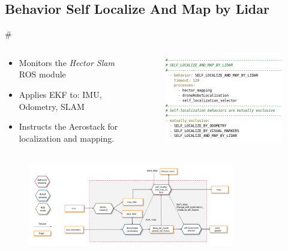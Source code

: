 \documentclass[]{beamer}
\def\mOrangeItem{\item[\textcolor{orange}{\textbullet}]}
\newcommand{\mSlideTitle}{{{\color{gray}\secname}} \# \subsecname}
\begin{document}
\subsection{Behavior Self Localize And Map by Lidar}
\begin{frame}{\mSlideTitle}
  \begin{columns}
    \begin{column}{0.5\textwidth}
      \begin{itemize}
        \mOrangeItem Monitors the \emph{Hector Slam} ROS module
        \mOrangeItem Applies EKF to: IMU, Odometry, SLAM
        \mOrangeItem Instructs the Aerostack for localization and mapping.
      \end{itemize}
    \end{column}
    \begin{column}{0.5\textwidth}
      \begin{figure}
        \centering
        \includegraphics[height=0.4\textheight,keepaspectratio]{BehaviorSlamCatalog.png}
      \end{figure}
    \end{column}
  \end{columns}
  \begin{figure}
    \centering
    \includegraphics[width=0.8\textwidth]{BehaviorSlamArquitecture.png}
  \end{figure}
\end{frame}
\end{document}
